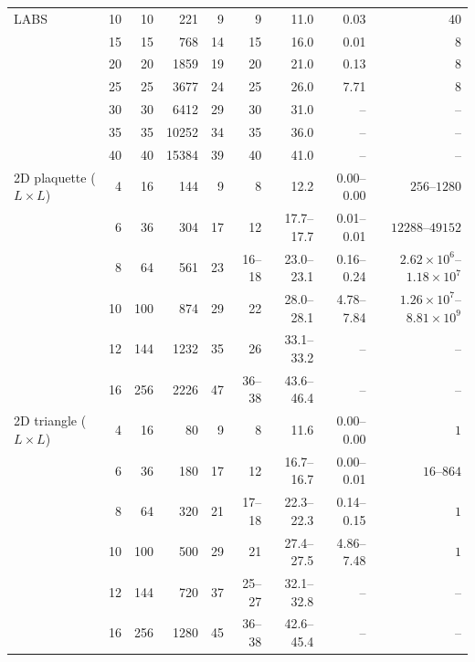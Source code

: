 \begin{tabular}{l rrr rr r rr}
\addlinespace[2pt]
LABS & 10 & 10 & 221 & 9 & 9 & 11.0 & 0.03 & $40$ \\
 & 15 & 15 & 768 & 14 & 15 & 16.0 & 0.01 & $8$ \\
 & 20 & 20 & 1859 & 19 & 20 & 21.0 & 0.13 & $8$ \\
 & 25 & 25 & 3677 & 24 & 25 & 26.0 & 7.71 & $8$ \\
 & 30 & 30 & 6412 & 29 & 30 & 31.0 & -- & -- \\
 & 35 & 35 & 10252 & 34 & 35 & 36.0 & -- & -- \\
 & 40 & 40 & 15384 & 39 & 40 & 41.0 & -- & -- \\
\addlinespace[2pt]
2D plaquette ($L{\times}L$) & 4 & 16 & 144 & 9 & 8 & 12.2 & 0.00--0.00 & $256$--$1280$ \\
 & 6 & 36 & 304 & 17 & 12 & 17.7--17.7 & 0.01--0.01 & $12288$--$49152$ \\
 & 8 & 64 & 561 & 23 & 16--18 & 23.0--23.1 & 0.16--0.24 & $2.62\times 10^{6}$--$1.18\times 10^{7}$ \\
 & 10 & 100 & 874 & 29 & 22 & 28.0--28.1 & 4.78--7.84 & $1.26\times 10^{7}$--$8.81\times 10^{9}$ \\
 & 12 & 144 & 1232 & 35 & 26 & 33.1--33.2 & -- & -- \\
 & 16 & 256 & 2226 & 47 & 36--38 & 43.6--46.4 & -- & -- \\
\addlinespace[2pt]
2D triangle ($L{\times}L$) & 4 & 16 & 80 & 9 & 8 & 11.6 & 0.00--0.00 & $1$ \\
 & 6 & 36 & 180 & 17 & 12 & 16.7--16.7 & 0.00--0.01 & $16$--$864$ \\
 & 8 & 64 & 320 & 21 & 17--18 & 22.3--22.3 & 0.14--0.15 & $1$ \\
 & 10 & 100 & 500 & 29 & 21 & 27.4--27.5 & 4.86--7.48 & $1$ \\
 & 12 & 144 & 720 & 37 & 25--27 & 32.1--32.8 & -- & -- \\
 & 16 & 256 & 1280 & 45 & 36--38 & 42.6--45.4 & -- & -- \\
\bottomrule
\end{tabular}